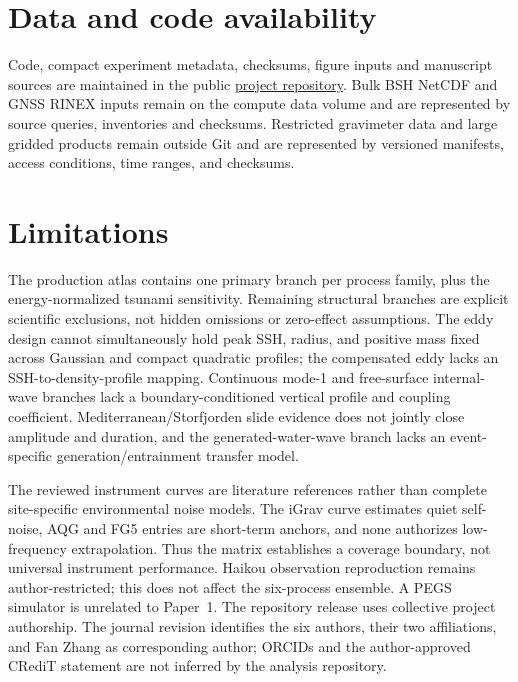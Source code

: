 \documentclass[11pt]{article}
\providecommand{\PaperBibliography}{references}
\begin{document}
\section{Data and code availability}
Code, compact experiment metadata, checksums, figure inputs and manuscript
sources are maintained in the public
\href{https://github.com/lanhung/osg}{project repository}. Bulk BSH NetCDF and
GNSS RINEX inputs remain on the compute data volume and are represented by
source queries, inventories and checksums. Restricted gravimeter data and large
gridded products remain outside Git and are represented by versioned manifests,
access conditions, time ranges, and checksums.
\ifdefined\JournalOfGeodesyVersion

\fi

\section{Limitations}
The production atlas contains one primary branch per process family, plus the
energy-normalized tsunami sensitivity. Remaining structural branches are
explicit scientific exclusions, not hidden omissions or zero-effect
assumptions. The eddy design cannot simultaneously hold peak SSH, radius, and
positive mass fixed across Gaussian and compact quadratic profiles; the
compensated eddy lacks an SSH-to-density-profile mapping. Continuous mode-1 and
free-surface internal-wave branches lack a boundary-conditioned vertical
profile and coupling coefficient. Mediterranean/Storfjorden slide evidence does
not jointly close amplitude and duration, and the generated-water-wave branch
lacks an event-specific generation/entrainment transfer model.

The reviewed instrument curves are literature references rather than complete
site-specific environmental noise models. The iGrav curve estimates quiet
self-noise, AQG and FG5 entries are short-term anchors, and none authorizes
low-frequency extrapolation. Thus the matrix establishes a coverage boundary,
not universal instrument performance. Haikou observation reproduction remains
author-restricted; this does not affect the six-process ensemble. A PEGS
simulator is unrelated to Paper~1. The repository release uses collective
project authorship. The journal revision identifies the six authors, their two
affiliations, and Fan Zhang as corresponding author; ORCIDs and the author-approved
CRediT statement are not inferred by the analysis repository.



\end{document}

